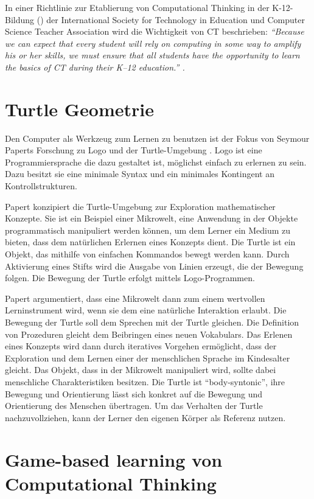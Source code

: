 In einer Richtlinie zur Etablierung von Computational Thinking in der K-12-Bildung
(\cite{leadership_toolkit}) der International Society for Technology in Education und Computer
Science Teacher Association wird die Wichtigkeit von CT beschrieben: \em \enquote{Because we can
expect that every student will rely on computing in some way to amplify his or her skills, we must
ensure that all students have the opportunity to learn the basics of CT during their K–12
education.} \em.

\section{Turtle Geometrie}

Den Computer als Werkzeug zum Lernen zu benutzen ist der Fokus von Seymour Paperts Forschung zu Logo
und der Turtle-Umgebung \cite{papert1980mindstorms}. Logo ist eine Programmiersprache die dazu
gestaltet ist, möglichst einfach zu erlernen zu sein. Dazu besitzt sie eine minimale Syntax und ein
minimales Kontingent an Kontrollstrukturen.

Papert konzipiert die Turtle-Umgebung zur Exploration mathematischer Konzepte. Sie ist ein Beispiel
einer Mikrowelt, eine Anwendung in der Objekte programmatisch manipuliert werden können, um dem
Lerner ein Medium zu bieten, dass dem natürlichen Erlernen eines Konzepts dient. Die Turtle ist ein
Objekt, das mithilfe von einfachen Kommandos bewegt werden kann. Durch Aktivierung eines Stifts wird
die Ausgabe von Linien erzeugt, die der Bewegung folgen. Die Bewegung der Turtle erfolgt mittels
Logo-Programmen.

Papert argumentiert, dass eine Mikrowelt dann zum einem wertvollen Lerninstrument wird, wenn sie dem
eine natürliche Interaktion erlaubt. Die Bewegung der Turtle soll dem Sprechen mit der Turtle
gleichen. Die Definition von Prozeduren gleicht dem Beibringen eines neuen Vokabulars. Das Erlenen
eines Konzepts wird dann durch iteratives Vorgehen ermöglicht, dass der Exploration und dem Lernen
einer der menschlichen Sprache im Kindesalter gleicht. Das Objekt, dass in der Mikrowelt manipuliert
wird, sollte dabei menschliche Charakteristiken besitzen. Die Turtle ist \enquote{body-syntonic},
ihre Bewegung und Orientierung lässt sich konkret auf die Bewegung und Orientierung des Menschen
übertragen. Um das Verhalten der Turtle nachzuvollziehen, kann der Lerner den eigenen Körper als
Referenz nutzen.


\section{Game-based learning von Computational Thinking}


